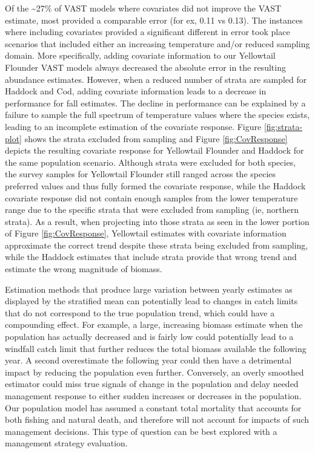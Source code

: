 \documentclass[
  12pt,
]{article}
\begin{document}
Of the \textasciitilde27\% of VAST models where covariates did not improve the VAST estimate, most provided a comparable error (for ex, 0.11 vs 0.13). The instances where including covariates provided a significant different in error took place scenarios that included either an increasing temperature and/or reduced sampling domain. More specifically, adding covariate information to our Yellowtail Flounder VAST models always decreased the absolute error in the resulting abundance estimates. However, when a reduced number of strata are sampled for Haddock and Cod, adding covariate information leads to a decrease in performance for fall estimates. The decline in performance can be explained by a failure to sample the full spectrum of temperature values where the species exists, leading to an incomplete estimation of the covariate response. Figure \ref{fig:strata-plot} shows the strata excluded from sampling and Figure \ref{fig:CovResponse} depicts the resulting covariate response for Yellowtail Flounder and Haddock for the same population scenario. Although strata were excluded for both species, the survey samples for Yellowtail Flounder still ranged across the species preferred values and thus fully formed the covariate response, while the Haddock covariate response did not contain enough samples from the lower temperature range due to the specific strata that were excluded from sampling (ie, northern strata). As a result, when projecting into those strata as seen in the lower portion of Figure \ref{fig:CovResponse}, Yellowtail estimates with covariate information approximate the correct trend despite these strata being excluded from sampling, while the Haddock estimates that include strata provide that wrong trend and estimate the wrong magnitude of biomass.

Estimation methods that produce large variation between yearly estimates as displayed by the stratified mean can potentially lead to changes in catch limits that do not correspond to the true population trend, which could have a compounding effect. For example, a large, increasing biomass estimate when the population has actually decreased and is fairly low could potentially lead to a windfall catch limit that further reduces the total biomass available the following year. A second overestimate the following year could then have a detrimental impact by reducing the population even further. Conversely, an overly smoothed estimator could miss true signals of change in the population and delay needed management response to either sudden increases or decreases in the population. Our population model has assumed a constant total mortality that accounts for both fishing and natural death, and therefore will not account for impacts of such management decisions. This type of question can be best explored with a management strategy evaluation.
\end{document}
